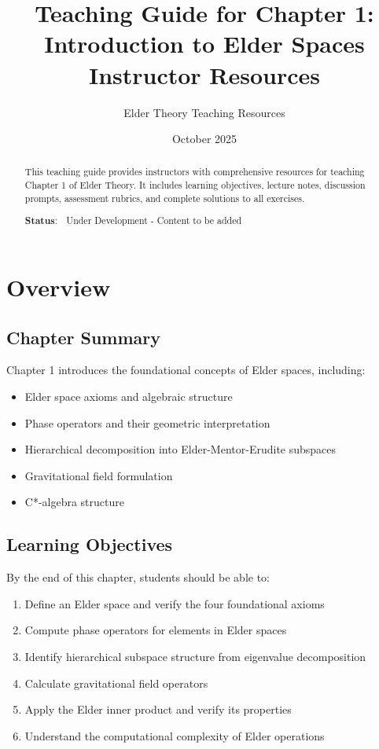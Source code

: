 \documentclass[12pt,a4paper]{article}
\title{\textbf{Teaching Guide for Chapter 1:}\\
\Large{Introduction to Elder Spaces}\\
\large{Instructor Resources}}
\author{Elder Theory Teaching Resources}
\date{October 2025}
\begin{document}
\maketitle

\begin{abstract}
This teaching guide provides instructors with comprehensive resources for teaching Chapter 1 of Elder Theory. It includes learning objectives, lecture notes, discussion prompts, assessment rubrics, and complete solutions to all exercises.

\textbf{Status}: 🚧 Under Development - Content to be added
\end{abstract}

\tableofcontents
\newpage

\section{Overview}

\subsection{Chapter Summary}
Chapter 1 introduces the foundational concepts of Elder spaces, including:
\begin{itemize}
    \item Elder space axioms and algebraic structure
    \item Phase operators and their geometric interpretation
    \item Hierarchical decomposition into Elder-Mentor-Erudite subspaces
    \item Gravitational field formulation
    \item C*-algebra structure
\end{itemize}

\subsection{Learning Objectives}

By the end of this chapter, students should be able to:
\begin{enumerate}
    \item Define an Elder space and verify the four foundational axioms
    \item Compute phase operators for elements in Elder spaces
    \item Identify hierarchical subspace structure from eigenvalue decomposition
    \item Calculate gravitational field operators
    \item Apply the Elder inner product and verify its properties
    \item Understand the computational complexity of Elder operations
\end{enumerate}
\end{document}
